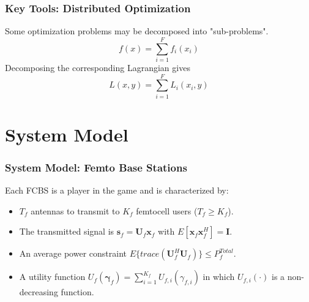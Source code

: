 \documentclass[10pt,tgadventor, onlymath]{beamer}
\begin{document}
\begin{frame}
\frametitle{Key Tools: Distributed Optimization}
Some optimization problems may be decomposed into "sub-problems".
\begin{equation}
f(x) = \sum_{i = 1}^{F} f_{i}(x_{i})
\end{equation}
Decomposing the corresponding Lagrangian gives
\begin{equation}
L(x,y) = \sum_{i = 1}^{F} L_i(x_i,y)
\end{equation}
\end{frame}
%

\section{System Model}
\begin{frame}
\frametitle{System Model: Femto Base Stations}
Each FCBS is a player in the game and is characterized by:
\\
\begin{itemize}
\setlength\itemsep{2em}

\item 
	$T_{f}$ antennas to transmit to $K_{f}$ femtocell users ($T_{f} \geq K_{f}$).
\item 
	The transmitted 		
	signal is $\mathbf{s}_{f
	}= \mathbf{U}_{f}\mathbf{x}_{f}$ with $E[\mathbf{x}_{f}\mathbf{x}_{f}^H] = \mathbf{I}$.
\item 
	An average power constraint $E\{trace(\mathbf{U}_{f}^H\mathbf{U}_{f})\} \leq P^{Total}_{f} $.
\item 
	A utility function $U_{f}(\boldsymbol{\gamma}_{f}) =
	\sum_{i=1}^{K_{f}}
    	 U_{f,i}(\gamma_{f,i}) $
    	in which $U_{f,i}(\cdot)$ is a non-decreasing function.
\end{itemize}
\end{frame}

\end{document}

